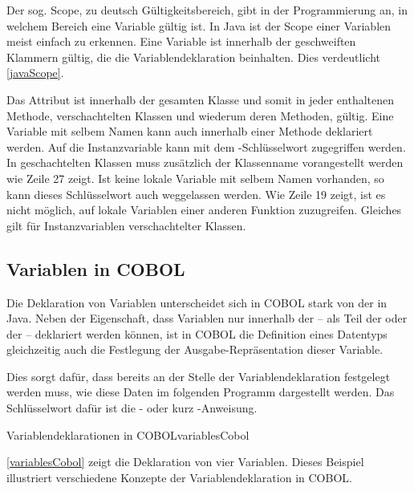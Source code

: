 Der sog. Scope, zu deutsch Gültigkeitsbereich, gibt in der Programmierung an, in welchem Bereich eine Variable gültig ist. In Java ist der Scope einer Variablen meist einfach zu erkennen. Eine Variable ist innerhalb der geschweiften Klammern gültig, die die Variablendeklaration beinhalten. Dies verdeutlicht \autoref{javaScope}.

Das Attribut  ist innerhalb der gesamten Klasse  und somit in jeder enthaltenen Methode, verschachtelten Klassen und wiederum deren Methoden, gültig. Eine Variable mit selbem Namen kann auch innerhalb einer Methode deklariert werden. Auf die Instanzvariable kann mit dem -Schlüsselwort zugegriffen werden. In geschachtelten Klassen muss zusätzlich der Klassenname vorangestellt werden wie Zeile 27 zeigt. Ist keine lokale Variable mit selbem Namen vorhanden, so kann dieses Schlüsselwort auch weggelassen werden. Wie Zeile 19 zeigt, ist es nicht möglich, auf lokale Variablen einer anderen Funktion zuzugreifen. Gleiches gilt für Instanzvariablen verschachtelter Klassen.


\subsection*{Variablen in COBOL}
Die Deklaration von Variablen unterscheidet sich in COBOL stark von der in Java. Neben der Eigenschaft, dass Variablen nur innerhalb der  -- als Teil der  oder der  -- deklariert werden können, ist in COBOL die Definition eines Datentyps gleichzeitig auch die Festlegung der Ausgabe-Repräsentation dieser Variable. 

Dies sorgt dafür, dass bereits an der Stelle der Variablendeklaration festgelegt werden muss, wie diese Daten im folgenden Programm dargestellt werden. Das Schlüsselwort dafür ist die - oder kurz -Anweisung.

\begin{codeWithCaption}{Variablendeklarationen in COBOL}{variablesCobol}
\end{codeWithCaption}

\autoref{variablesCobol} zeigt die Deklaration von vier Variablen. Dieses Beispiel illustriert verschiedene Konzepte der Variablendeklaration in COBOL.

